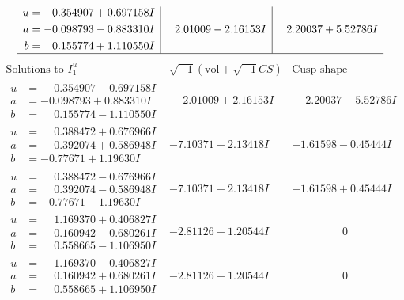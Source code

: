 \documentclass[1p]{elsarticle_modified}
\theoremstyle{definition}
\newcommand{\I}{\sqrt{-1}}
\begin{document}
$$\begin{array}{c|c|c}
\begin{aligned}
u &= \phantom{-}0.354907 + 0.697158 I \\
a &= -0.098793 - 0.883310 I \\
b &= \phantom{-}0.155774 + 1.110550 I\end{aligned}
 & \phantom{-}2.01009 - 2.16153 I & \phantom{-}2.20037 + 5.52786 I\\
 \hline 
 \end{array}$$\newpage$$\begin{array}{c|c|c}  
\text{Solutions to }I^u_{1}& \I (\text{vol} + \sqrt{-1}CS) & \text{Cusp shape}\\
 \hline 
\begin{aligned}
u &= \phantom{-}0.354907 - 0.697158 I \\
a &= -0.098793 + 0.883310 I \\
b &= \phantom{-}0.155774 - 1.110550 I\end{aligned}
 & \phantom{-}2.01009 + 2.16153 I & \phantom{-}2.20037 - 5.52786 I \\ \hline\begin{aligned}
u &= \phantom{-}0.388472 + 0.676966 I \\
a &= \phantom{-}0.392074 + 0.586948 I \\
b &= -0.77671 + 1.19630 I\end{aligned}
 & -7.10371 + 2.13418 I & -1.61598 - 0.45444 I \\ \hline\begin{aligned}
u &= \phantom{-}0.388472 - 0.676966 I \\
a &= \phantom{-}0.392074 - 0.586948 I \\
b &= -0.77671 - 1.19630 I\end{aligned}
 & -7.10371 - 2.13418 I & -1.61598 + 0.45444 I \\ \hline\begin{aligned}
u &= \phantom{-}1.169370 + 0.406827 I \\
a &= \phantom{-}0.160942 - 0.680261 I \\
b &= \phantom{-}0.558665 - 1.106950 I\end{aligned}
 & -2.81126 - 1.20544 I & \phantom{-0.000000 } 0 \\ \hline\begin{aligned}
u &= \phantom{-}1.169370 - 0.406827 I \\
a &= \phantom{-}0.160942 + 0.680261 I \\
b &= \phantom{-}0.558665 + 1.106950 I\end{aligned}
 & -2.81126 + 1.20544 I & \phantom{-0.000000 } 0 \\ \hline\begin{aligned}

\end{aligned}
\end{array}$$
\end{document}
